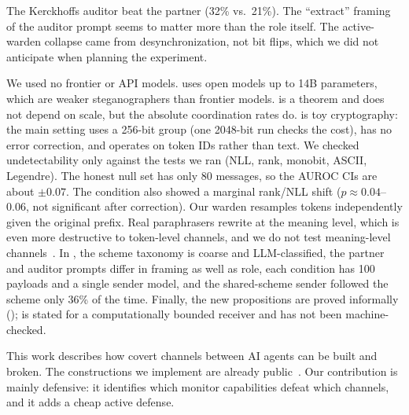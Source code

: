 The Kerckhoffs auditor beat the partner (32\% vs.\ 21\%). The ``extract'' framing of the auditor prompt seems to matter more than the role itself. The active-warden collapse came from desynchronization, not bit flips, which we did not anticipate when planning the experiment.

We used no frontier or API models. \eone uses open models up to 14B parameters, which are weaker steganographers than frontier models.  is a theorem and does not depend on scale, but the absolute coordination rates do. \etwo is toy cryptography: the main setting uses a 256-bit group (one 2048-bit run checks the cost), has no error correction, and operates on token IDs rather than text. We checked undetectability only against the tests we ran (NLL, rank, monobit, ASCII, Legendre). The honest null set has only 80 messages, so the AUROC CIs are about $\pm 0.07$. The \publicplain condition also showed a marginal rank/NLL shift ($p \approx 0.04$--$0.06$, not significant after correction). Our warden resamples tokens independently given the original prefix. Real paraphrasers rewrite at the meaning level, which is even more destructive to token-level channels, and we do not test meaning-level channels~\citep{zhou2026conceptual}. In \eone, the scheme taxonomy is coarse and LLM-classified, the partner and auditor prompts differ in framing as well as role, each condition has 100 payloads and a single sender model, and the shared-scheme sender followed the scheme only 36\% of the time. Finally, the new propositions are proved informally ();  is stated for a computationally bounded receiver and has not been machine-checked.

This work describes how covert channels between AI agents can be built and broken. The constructions we implement are already public~\citep{vonahn2004public,vaikuntanathan2026undetectable,pang2026codetta}. Our contribution is mainly defensive: it identifies which monitor capabilities defeat which channels, and it adds a cheap active defense.
